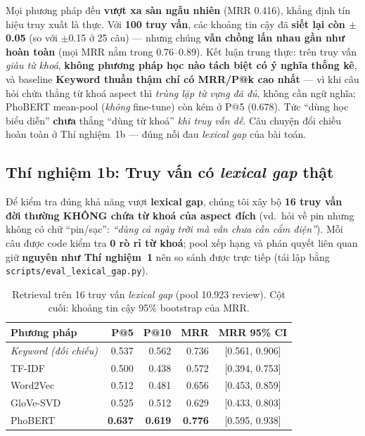 \documentclass[12pt,a4paper]{article}
\begin{document}
\noindent Mọi phương pháp đều \textbf{vượt xa sàn ngẫu nhiên} (MRR 0.416), khẳng định tín hiệu truy xuất là thực. Với \textbf{100 truy vấn}, các khoảng tin cậy đã \textbf{siết lại còn $\pm$0.05} (so với $\pm$0.15 ở 25 câu) --- nhưng chúng \textbf{vẫn chồng lấn nhau gần như hoàn toàn} (mọi MRR nằm trong 0.76--0.89). Kết luận trung thực: trên truy vấn \textit{giàu từ khoá}, \textbf{không phương pháp học nào tách biệt có ý nghĩa thống kê}, và baseline \textbf{Keyword thuần thậm chí có MRR/P@k cao nhất} --- vì khi câu hỏi chứa thẳng từ khoá aspect thì \textit{trùng lặp từ vựng đã đủ}, không cần ngữ nghĩa; PhoBERT mean-pool (\textit{không} fine-tune) còn kém ở P@5 (0.678). Tức ``dùng học biểu diễn'' \textbf{chưa} thắng ``dùng từ khoá'' \textit{khi truy vấn dễ}. Câu chuyện đổi chiều hoàn toàn ở Thí nghiệm~1b --- đúng nỗi đau \textit{lexical gap} của bài toán.

\subsection{Thí nghiệm 1b: Truy vấn có \textit{lexical gap} thật}
\label{sec:exp1b}

Để kiểm tra đúng khả năng vượt \textbf{lexical gap}, chúng tôi xây bộ \textbf{16 truy vấn đời thường KHÔNG chứa từ khoá của aspect đích} (vd.\ hỏi về pin nhưng không có chữ ``pin/sạc'': \textit{``dùng cả ngày trời mà vẫn chưa cần cắm điện''}). Mỗi câu được code kiểm tra \textbf{0 rò rỉ từ khoá}; pool xếp hạng và phán quyết liên quan giữ \textbf{nguyên như Thí nghiệm~1} nên so sánh được trực tiếp (tái lập bằng \texttt{scripts/eval\_lexical\_gap.py}).

\begin{table}[H]
\centering
\caption{Retrieval trên 16 truy vấn \textit{lexical gap} (pool 10.923 review). Cột cuối: khoảng tin cậy 95\% bootstrap của MRR.}
\begin{tabular}{lrrrc}
\toprule
\textbf{Phương pháp} & \textbf{P@5} & \textbf{P@10} & \textbf{MRR} & \textbf{MRR 95\% CI} \\
\midrule
\textit{Keyword (đối chiếu)} & 0.537 & 0.562 & 0.736 & [0.561, 0.906] \\
TF-IDF     & 0.500 & 0.438 & 0.572 & [0.394, 0.753] \\
Word2Vec   & 0.512 & 0.481 & 0.656 & [0.453, 0.859] \\
GloVe-SVD  & 0.525 & 0.512 & 0.629 & [0.433, 0.803] \\
PhoBERT    & \textbf{0.637} & \textbf{0.619} & \textbf{0.776} & [0.595, 0.938] \\
\bottomrule
\end{tabular}
\end{table}
\end{document}
